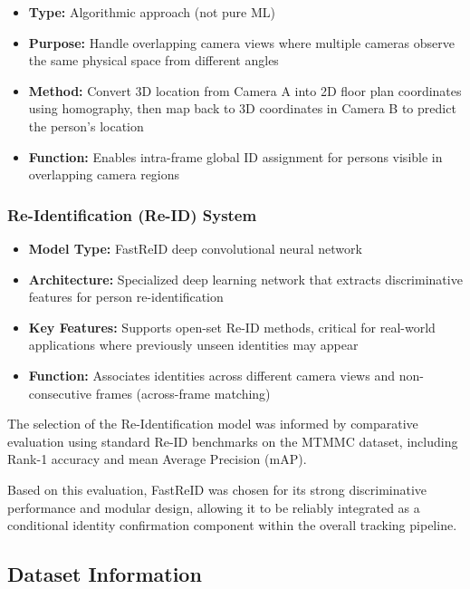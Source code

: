 \begin{itemize}
    \item \textbf{Type:} Algorithmic approach (not pure ML)
    \item \textbf{Purpose:} Handle overlapping camera views where multiple cameras observe the same physical space from different angles
    \item \textbf{Method:} Convert 3D location from Camera A into 2D floor plan coordinates using homography, then map back to 3D coordinates in Camera B to predict the person's location
    \item \textbf{Function:} Enables intra-frame global ID assignment for persons visible in overlapping camera regions
\end{itemize}

\subsubsection{Re-Identification (Re-ID) System}
\label{subsubsection:reid-system}

\begin{itemize}
    \item \textbf{Model Type:} FastReID deep convolutional neural network
    \item \textbf{Architecture:} Specialized deep learning network that extracts discriminative features for person re-identification
    \item \textbf{Key Features:} Supports open-set Re-ID methods, critical for real-world applications where previously unseen identities may appear
    \item \textbf{Function:} Associates identities across different camera views and non-consecutive frames (across-frame matching)
\end{itemize}

The selection of the Re-Identification model was informed by comparative evaluation using standard Re-ID benchmarks on the MTMMC dataset, including Rank-1 accuracy and mean Average Precision (mAP).

Based on this evaluation, FastReID was chosen for its strong discriminative performance and modular design, allowing it to be reliably integrated as a conditional identity confirmation component within the overall tracking pipeline.

\subsection{Dataset Information}
\label{subsection:dataset-information}

